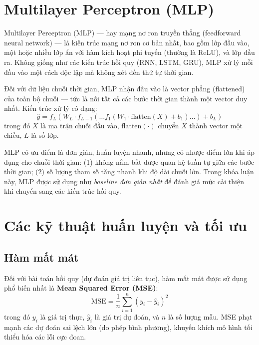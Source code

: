 \section{Multilayer Perceptron (MLP)}
\label{sec:mlp}

Multilayer Perceptron (MLP) — hay mạng nơ ron truyền thẳng (feedforward neural network) — là kiến trúc mạng nơ ron cơ bản nhất, bao gồm lớp đầu vào, một hoặc nhiều lớp ẩn với hàm kích hoạt phi tuyến (thường là ReLU), và lớp đầu ra. Không giống như các kiến trúc hồi quy (RNN, LSTM, GRU), MLP xử lý mỗi đầu vào một cách độc lập mà không xét đến thứ tự thời gian.

Đối với dữ liệu chuỗi thời gian, MLP nhận đầu vào là vector phẳng (flattened) của toàn bộ chuỗi — tức là nối tất cả các bước thời gian thành một vector duy nhất. Kiến trúc xử lý có dạng:
\begin{equation}
    \hat{y} = f_L(W_L \cdot f_{L-1}(\dots f_1(W_1 \cdot \text{flatten}(X) + b_1) \dots) + b_L)
\end{equation}
trong đó $X$ là ma trận chuỗi đầu vào, $\text{flatten}(\cdot)$ chuyển $X$ thành vector một chiều, $L$ là số lớp.

MLP có ưu điểm là đơn giản, huấn luyện nhanh, nhưng có nhược điểm lớn khi áp dụng cho chuỗi thời gian: (1) không nắm bắt được quan hệ tuần tự giữa các bước thời gian; (2) số lượng tham số tăng nhanh khi độ dài chuỗi lớn. Trong khóa luận này, MLP được sử dụng như \textit{baseline đơn giản nhất} để đánh giá mức cải thiện khi chuyển sang các kiến trúc hồi quy.


\section{Các kỹ thuật huấn luyện và tối ưu}
\label{sec:training_techniques}

\subsection{Hàm mất mát}

Đối với bài toán hồi quy (dự đoán giá trị liên tục), hàm mất mát được sử dụng phổ biến nhất là \textbf{Mean Squared Error (MSE)}:
\begin{equation}
    \text{MSE} = \frac{1}{n}\sum_{i=1}^{n}(y_i - \hat{y}_i)^2
\end{equation}
trong đó $y_i$ là giá trị thực, $\hat{y}_i$ là giá trị dự đoán, và $n$ là số lượng mẫu. MSE phạt mạnh các dự đoán sai lệch lớn (do phép bình phương), khuyến khích mô hình tối thiểu hóa các lỗi cực đoan.

